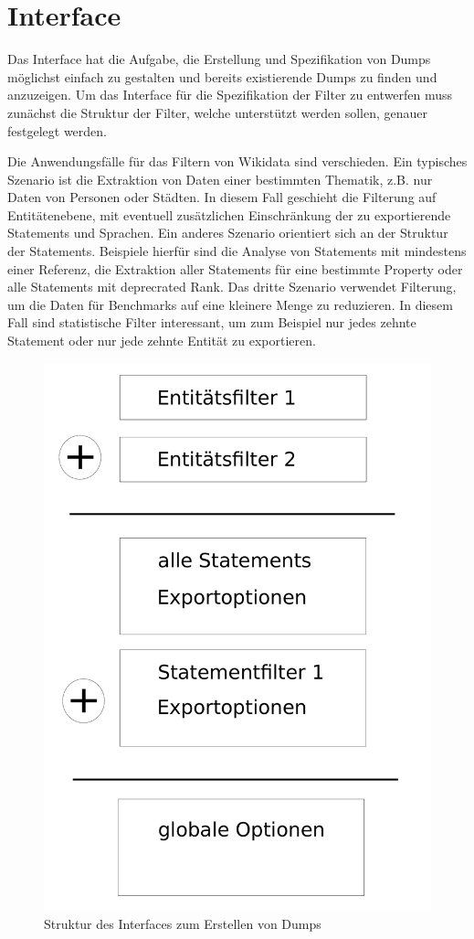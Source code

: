 \section{Interface}
Das Interface hat die Aufgabe, die Erstellung und Spezifikation von Dumps möglichst einfach zu gestalten und bereits existierende Dumps zu finden und anzuzeigen.
Um das Interface für die Spezifikation der Filter zu entwerfen muss zunächst die Struktur der Filter, welche unterstützt werden sollen, genauer festgelegt werden.

Die Anwendungsfälle für das Filtern von Wikidata sind verschieden.
Ein typisches Szenario ist die Extraktion von Daten einer bestimmten Thematik, z.B. nur Daten von Personen oder Städten.
In diesem Fall geschieht die Filterung auf Entitätenebene, mit eventuell zusätzlichen Einschränkung der zu exportierende Statements und Sprachen.
Ein anderes Szenario orientiert sich an der Struktur der Statements.
Beispiele hierfür sind die Analyse von Statements mit mindestens einer Referenz, die Extraktion aller Statements für eine bestimmte Property oder alle Statements mit deprecrated Rank.
Das dritte Szenario verwendet Filterung, um die Daten für Benchmarks auf eine kleinere Menge zu reduzieren.
In diesem Fall sind statistische Filter interessant, um zum Beispiel nur jedes zehnte Statement oder nur jede zehnte Entität zu exportieren.

\begin{figure}
  \includegraphics[width=\textwidth]{pics/ui-layout}
  \caption{Struktur des Interfaces zum Erstellen von Dumps}
  \label{fig:ui-layout}
\end{figure}

